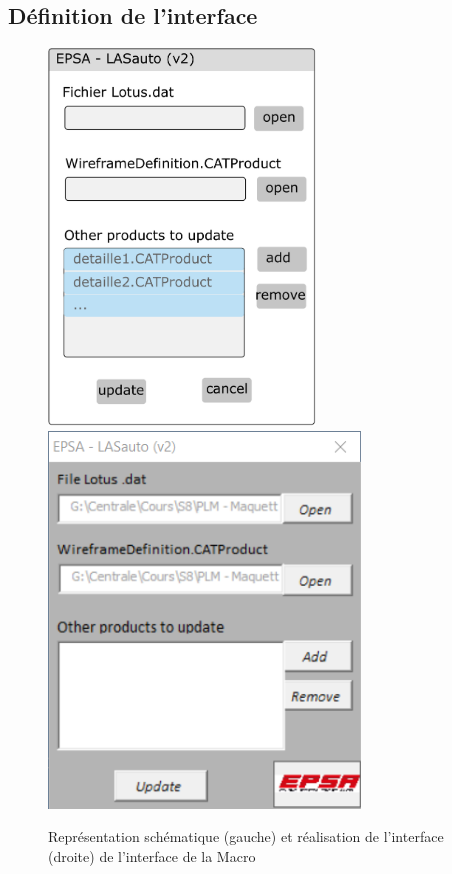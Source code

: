\subsection{Définition de l'interface} %
\begin{figure}[H]
    \centering
    \includegraphics[height=10cm]{img/interfaceGraphique.pdf}
    \includegraphics[height=10cm]{img/interface.png}
    \caption{Représentation schématique (gauche) et réalisation de l'interface (droite) de l'interface de la Macro}
    \label{fig:interfaceGraphique}
\end{figure}

